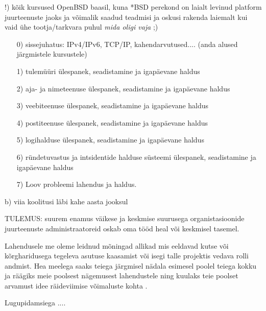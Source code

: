 !) kõik kursused OpenBSD baasil, kuna *BSD perekond on laialt levinud platform juurteenuste jaoks ja võimalik saadud teadmisi ja oskusi rakenda laiemalt kui vaid ühe tootja/tarkvara puhul \emph{mida oligi vaja} ;)

\begin{itemize}
	\item[0)] sissejuhatus: IPv4/IPv6, TCP/IP, kahendarvutused.... (anda alused järgmistele kursustele)
	\item[1)] tulemüüri ülespanek, seadistamine ja igapäevane haldus
	\item[2)] aja- ja nimeteenuse ülespanek, seadistamine ja igapäevane haldus
	\item[3)] veebiteenuse ülespanek, seadistamine ja igapäevane haldus
	\item[4)] postiteenuse ülespanek, seadistamine ja igapäevane haldus
	\item[5)] logihalduse ülespanek, seadistamine ja igapäevane haldus
	\item[6)] ründetuvastus ja intsidentide halduse süsteemi ülespanek, seadistamine ja igapäevane haldus
	\item[7)] Loov probleemi lahendus ja haldus.

\end{itemize}


b) viia koolitusi läbi kahe aasta jooksul

TULEMUS:
suurem enamus väikese ja keskmise suurusega organistasioonide juurteenuste administraatoreid oskab oma tööd heal või keskmisel tasemel.


Lahendusele me oleme leidnud mõningad allikad mis eeldavad kutse või kõrgharidusega tegeleva asutuse kaasamist või isegi talle projektis vedava rolli andmist.
Hea meelega saaks teiega järgmisel nädala esimesel poolel teiega kokku ja räägiks meie poolsest nägemusest lahendustele ning kuulaks teie poolset arvamust idee räideviimise võimaluste kohta .

Lugupidamsiega ....
\normalfont
